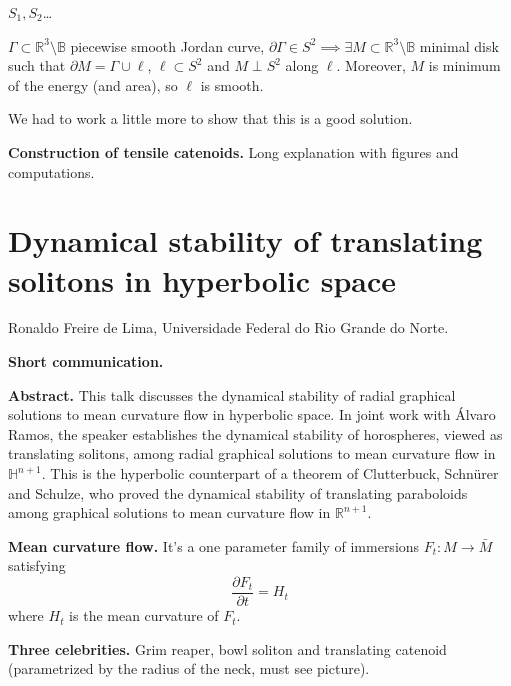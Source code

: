 \begin{theorem}[Joachimstahl]
\label{theorem-j}
$S_1, S_2$…
\end{theorem}

\begin{theorem}
\label{theorem-dhkw}
$\Gamma \subset \mathbb{R}^3\setminus
\mathbb{B}$ piecewise smooth Jordan curve,
$\partial \Gamma \in S^2 \implies \exists M
\subset \mathbb{R}^3 \setminus \mathbb{B}$
minimal disk such that $\partial M = \Gamma
\cup  \ell$, $\ell \subset S^2$ and $M \perp
S^2$ along $\ell$. Moreover, $M$ is minimum
of the energy (and area), so $\ell$ is
smooth.
\end{theorem}

\noindent
We had to work a little more to show that
this is a good solution.

\medskip\noindent
{\bf Construction of tensile catenoids.}
Long explanation with figures and
computations.

\section{Dynamical stability of
translating solitons in hyperbolic space}
\label{section-dynamical-stability-solitons}

\medskip\noindent
Ronaldo Freire de Lima,
Universidade Federal do Rio Grande do
Norte.

\medskip\noindent
{\bf Short communication.}

\medskip\noindent
{\bf Abstract.}
This talk discusses the dynamical
stability of radial graphical solutions
to mean curvature flow in hyperbolic
space. In joint work with \'Alvaro Ramos,
the speaker establishes the dynamical
stability of horospheres, viewed as
translating solitons, among radial
graphical solutions to mean curvature
flow in $\mathbb{H}^{n+1}$. This is the
hyperbolic counterpart of a theorem of
Clutterbuck, Schn\"urer and Schulze, who
proved the dynamical stability of
translating paraboloids among graphical
solutions to mean curvature flow in
$\mathbb{R}^{n+1}$.

\medskip\noindent
{\bf Mean curvature flow.}
It's a one parameter family of immersions 
$F_t:M \to \bar{M}$
satisfying
$$
\frac{\partial F_t}{\partial t}=H_t
$$
where $H_t$ is the mean curvature of $F_t$.

\medskip\noindent
{\bf Three celebrities.}
Grim reaper, bowl soliton and translating
catenoid (parametrized by the radius of the
neck, must see picture).

